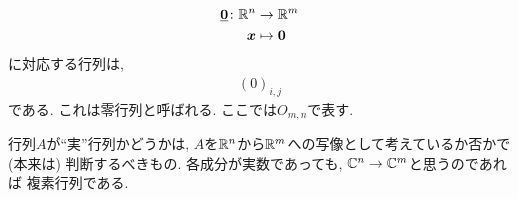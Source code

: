 \begin{remark}
\begin{align*}
  \underline{\boldsymbol{0}} \colon \mathbb{R}^n&\to \mathbb{R}^m\\
  \boldsymbol{x} &\mapsto \boldsymbol{0}
\end{align*}
  に対応する行列は,
\begin{align*}
  (0)_{i,j}
\end{align*}
である.
これは零行列と呼ばれる.
ここでは$O_{m,n}$で表す.
\end{remark}
\begin{remark}
  行列$A$が``実''行列かどうかは,
  $A$を$\mathbb{R}^n$から$\mathbb{R}^m$への写像として考えているか否かで
  (本来は) 判断するべきもの.
  各成分が実数であっても,
  $\mathbb{C}^n\to \mathbb{C}^m$と思うのであれば
  複素行列である.
\end{remark}



